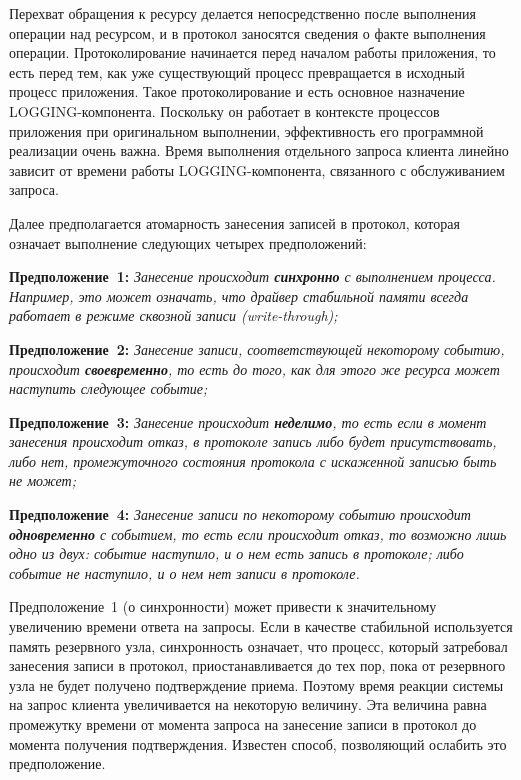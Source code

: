 \begin{multicols}{2}
Перехват обращения к ресурсу делается непосредственно после выполнения
операции над ресурсом, и в протокол заносятся сведения о факте выполнения
операции. Протоколирование начинается перед началом работы приложения, то
есть перед тем, как уже существующий процесс превращается в исходный
процесс приложения. Такое протоколирование и есть основное назначение
LOGGING-компонента.  Поскольку он работает в контексте процессов
приложения при оригинальном выполнении, эффективность его программной
реализации очень важна. Время выполнения отдельного запроса клиента
линейно зависит от времени работы LOGGING-компонента, связанного с
обслуживанием запроса.

Далее предполагается атомарность занесения записей в протокол, которая
означает выполнение следующих четырех предположений:

\medskip
\textbf{Предположение~1:} \textit{Занесение происходит \textbf{синхронно} с 
выполнением процесса. Например, это может означать, что драйвер стабильной 
памяти всегда работает в режиме сквозной записи (\textit{write-through});}

\medskip
\textbf{Предположение~2:} \textit{Занесение записи, соответствующей некоторому 
событию, происходит \textbf{своевременно}, то есть до того, как для этого же 
ресурса может наступить следующее событие;}

\medskip
\textbf{Предположение~3:} \textit{Занесение происходит \textbf{неделимо}, то 
есть если в момент занесения происходит отказ, в протоколе запись либо будет 
присутствовать, либо нет, промежуточного состояния протокола с искаженной 
записью быть не может;}

\medskip
\textbf{Предположение~4:} \textit{Занесение записи по некоторому событию 
происходит \textbf{одновременно} с событием, то есть если происходит отказ, то 
возможно лишь одно из двух: событие наступило, и о нем есть запись в протоколе; 
либо событие не наступило, и о нем нет записи в протоколе.}

\medskip
Предположение~1 (о синхронности) может привести к значительному
увеличению времени ответа на запросы. Если в качестве стабильной
используется память резервного \mbox{узла}, синхронность означает, что процесс,
который затребовал занесения записи в протокол, приостанавливается до тех
пор, пока от резервного узла не будет получено подтверждение приема.
Поэтому время реакции системы
 на запрос клиента  увеличивается на
некоторую величину. Эта величина равна промежутку времени от момента
запроса на занесение записи в протокол до момента получения подтверждения.
Известен способ, позволяющий ослабить это предположение.


\end{multicols}
